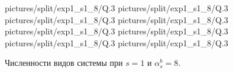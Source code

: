 \begin{figure}[H]
    \centering
       {pictures/split/exp1_s1_8/Q}{.3}
      {pictures/split/exp1_s1_8/Q}{.3}
      {pictures/split/exp1_s1_8/Q}{.3}
      {pictures/split/exp1_s1_8/Q}{.3}
      {pictures/split/exp1_s1_8/Q}{.3}
      {pictures/split/exp1_s1_8/Q}{.3}
      {pictures/split/exp1_s1_8/Q}{.3}
     {pictures/split/exp1_s1_8/Q}{.3}
\caption{Численности видов системы при \(s=1\) и \(\alpha^b_s = 8\).}  \label{fig:split_exp1_s1_8}
\end{figure}